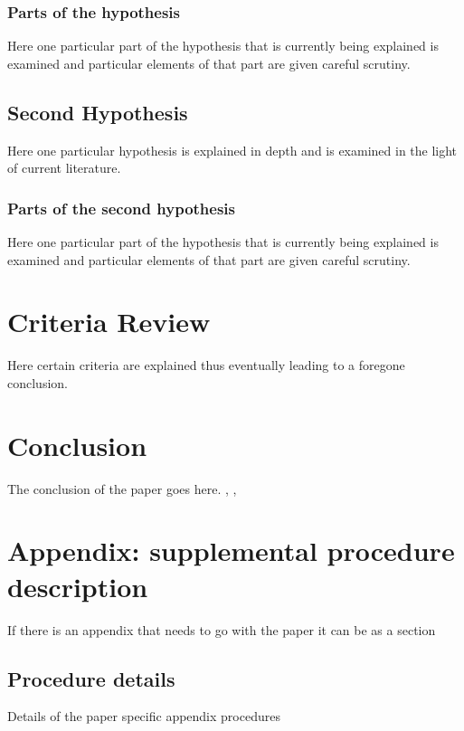 \subsubsection{Parts of the hypothesis}

Here one particular part of the hypothesis that is 
currently being explained is examined and particular
elements of that part are given careful scrutiny.


\subsection{Second Hypothesis}

Here one particular hypothesis is explained in depth
and is examined in the light of current literature.

\subsubsection{Parts of the second hypothesis}

Here one particular part of the hypothesis that is 
currently being explained is examined and particular
elements of that part are given careful scrutiny.

\section{Criteria Review}

Here certain criteria are explained thus eventually
leading to a foregone conclusion.

\section{Conclusion}\label{conclusion}

The conclusion of the paper goes here.
\cite{cox}
\cite{Ancey1996}, \cite{RR73} 
\cite{Aup91}, \cite{Dou72} 

\section{Appendix: supplemental procedure description}
If there is an appendix that needs to go with the paper it can be as a section

\subsection{Procedure details}
Details of the paper specific appendix procedures



\begingroup
    \setlength{\bibsep}{13.2pt}
    \linespread{1}\selectfont
    
\endgroup
\clearpage
\pagebreak
